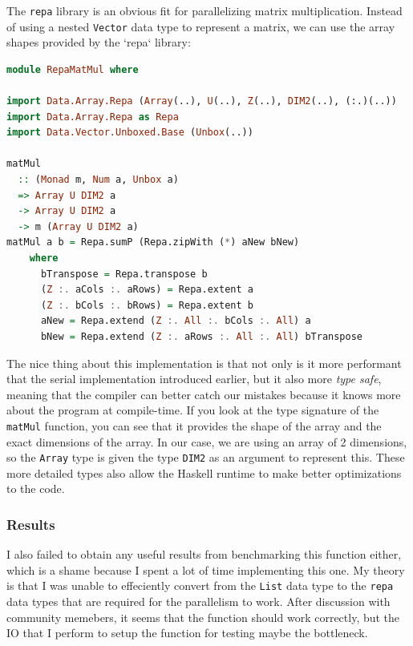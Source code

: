 \documentclass[a4paper, 10pt]{article}
\begin{document}
The \lstinline{repa} library is an obvious fit for parallelizing matrix multiplication. Instead of using a nested \lstinline{Vector} data type to represent a matrix, we can use the array shapes provided by the `repa` library:

\begin{lstlisting}[language=Haskell, caption=Matrix multiplication using repa library]
module RepaMatMul where

import Data.Array.Repa (Array(..), U(..), Z(..), DIM2(..), (:.)(..))
import Data.Array.Repa as Repa
import Data.Vector.Unboxed.Base (Unbox(..))

matMul
  :: (Monad m, Num a, Unbox a)
  => Array U DIM2 a
  -> Array U DIM2 a
  -> m (Array U DIM2 a)
matMul a b = Repa.sumP (Repa.zipWith (*) aNew bNew)
    where
      bTranspose = Repa.transpose b
      (Z :. aCols :. aRows) = Repa.extent a
      (Z :. bCols :. bRows) = Repa.extent b
      aNew = Repa.extend (Z :. All :. bCols :. All) a
      bNew = Repa.extend (Z :. aRows :. All :. All) bTranspose
\end{lstlisting}

The nice thing about this implementation is that not only is it more performant that the serial implementation introduced earlier, but it also more \textit{type safe}, meaning that the compiler can better catch our mistakes because it knows more about the program at compile-time. If you look at the type signature of the \lstinline{matMul} function, you can see that it provides the shape of the array and the exact dimensions of the array. In our case, we are using an array of 2 dimensions, so the \lstinline{Array} type is given the type \lstinline{DIM2} as an argument to represent this. These more detailed types also allow the Haskell runtime to make better optimizations to the code.

\subsubsection{Results}

I also failed to obtain any useful results from benchmarking this function either, which is a shame because I spent a lot of time implementing this one. My theory is that I was unable to effeciently convert from the \lstinline{List} data type to the \lstinline{repa} data types that are required for the parallelism to work. After discussion with community memebers, it seems that the function should work correctly, but the IO that I perform to setup the function for testing maybe the bottleneck.
\end{document}
